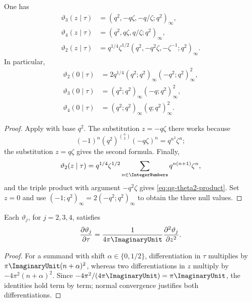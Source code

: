 \begin{proposition}
\label{qg:prop-theta-products}
One has
\begin{align}
 \vartheta_3(z\mid\tau)
  &=(q^2,-q\zeta,-q/\zeta;q^2)_\infty,
 \label{eq:qg-theta3-product}\\
 \vartheta_4(z\mid\tau)
  &=(q^2,q\zeta,q/\zeta;q^2)_\infty,
 \label{eq:qg-theta4-product}\\
 \vartheta_2(z\mid\tau)
  &=q^{1/4}\zeta^{1/2}
    (q^2,-q^2\zeta,-\zeta^{-1};q^2)_\infty.
 \label{eq:qg-theta2-product}
\end{align}
In particular,
\begin{align}
 \vartheta_2(0\mid\tau)
  &=2q^{1/4}(q^2;q^2)_\infty(-q^2;q^2)_\infty^2,
 \label{eq:qg-theta2-null}\\
 \vartheta_3(0\mid\tau)
  &=(q^2;q^2)_\infty(-q;q^2)_\infty^2,
 \label{eq:qg-theta3-null}\\
 \vartheta_4(0\mid\tau)
  &=(q^2;q^2)_\infty(q;q^2)_\infty^2.
 \label{eq:qg-theta4-null}
\end{align}
\end{proposition}

\begin{proof}
Apply  with base $q^2$.  The substitution $z=-q\zeta$
there works because
\[
 (-1)^n(q^2)^{\binom n2}(-q\zeta)^n=q^{n^2}\zeta^n;
\]
the substitution $z=q\zeta$ gives the second formula.  Finally,
\[
 \vartheta_2(z\mid\tau)
 =q^{1/4}\zeta^{1/2}
  \sum_{n\in\IntegerNumbers}q^{n(n+1)}\zeta^n,
\]
and the triple product with argument $-q^2\zeta$ gives
\eqref{eq:qg-theta2-product}.  Set $z=0$ and use
$(-1;q^2)_\infty=2(-q^2;q^2)_\infty$ to obtain the three null values.
\end{proof}

\begin{proposition}
\label{qg:prop-theta-heat}
Each $\vartheta_j$, for $j=2,3,4$, satisfies
\begin{equation}
 \frac{\partial\vartheta_j}{\partial\tau}
 =\frac{1}{4\pi\ImaginaryUnit}
   \frac{\partial^2\vartheta_j}{\partial z^2}.
\label{eq:qg-theta-heat}
\end{equation}
\end{proposition}

\begin{proof}
For a summand with shift $\alpha\in\{0,1/2\}$, differentiation in
$\tau$ multiplies by $\pi\ImaginaryUnit(n+\alpha)^2$, whereas two
differentiations in $z$ multiply by $-4\pi^2(n+\alpha)^2$.  Since
$-4\pi^2/(4\pi\ImaginaryUnit)=\pi\ImaginaryUnit$, the identities hold
term by term; normal convergence justifies both differentiations.
\end{proof}

